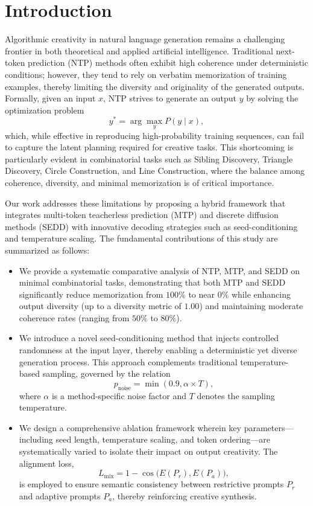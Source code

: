 \documentclass{article} %
\begin{document}
\section{Introduction}
Algorithmic creativity in natural language generation remains a challenging frontier in both theoretical and applied artificial intelligence. Traditional next-token prediction (NTP) methods often exhibit high coherence under deterministic conditions; however, they tend to rely on verbatim memorization of training examples, thereby limiting the diversity and originality of the generated outputs. Formally, given an input \( x \), NTP strives to generate an output \( y \) by solving the optimization problem
\[
y^* = \arg\max_{y} P(y \mid x),
\]
which, while effective in reproducing high-probability training sequences, can fail to capture the latent planning required for creative tasks. This shortcoming is particularly evident in combinatorial tasks such as Sibling Discovery, Triangle Discovery, Circle Construction, and Line Construction, where the balance among coherence, diversity, and minimal memorization is of critical importance.

Our work addresses these limitations by proposing a hybrid framework that integrates multi-token teacherless prediction (MTP) and discrete diffusion methods (SEDD) with innovative decoding strategies such as seed-conditioning and temperature scaling. The fundamental contributions of this study are summarized as follows:
\begin{itemize}
    \item We provide a systematic comparative analysis of NTP, MTP, and SEDD on minimal combinatorial tasks, demonstrating that both MTP and SEDD significantly reduce memorization from \(100\%\) to near \(0\%\) while enhancing output diversity (up to a diversity metric of \(1.00\)) and maintaining moderate coherence rates (ranging from \(50\%\) to \(80\%\)).
    \item We introduce a novel seed-conditioning method that injects controlled randomness at the input layer, thereby enabling a deterministic yet diverse generation process. This approach complements traditional temperature-based sampling, governed by the relation
    \[
    p_{\text{noise}} = \min(0.9, \alpha \times T),
    \]
    where \(\alpha\) is a method-specific noise factor and \(T\) denotes the sampling temperature.
    \item We design a comprehensive ablation framework wherein key parameters—including seed length, temperature scaling, and token ordering—are systematically varied to isolate their impact on output creativity. The alignment loss,
    \[
    L_{\text{mix}} = 1 - \cos\Big(E(P_r), E(P_a)\Big),
    \]
    is employed to ensure semantic consistency between restrictive prompts \(P_r\) and adaptive prompts \(P_a\), thereby reinforcing creative synthesis.
\end{itemize}
\end{document}
